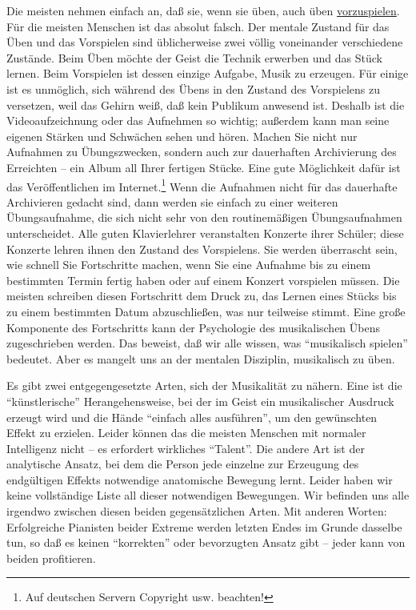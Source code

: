 Die meisten nehmen einfach an, daß sie, wenn sie üben, auch üben \hyperref[c1iii14]{vorzuspielen}.
Für die meisten Menschen ist das absolut falsch.
Der mentale Zustand für das Üben und das Vorspielen sind üblicherweise zwei völlig voneinander verschiedene Zustände.
Beim Üben möchte der Geist die Technik erwerben und das Stück lernen.
Beim Vorspielen ist dessen einzige Aufgabe, Musik zu erzeugen.
Für einige ist es unmöglich, sich während des Übens in den Zustand des Vorspielens zu versetzen, weil das Gehirn weiß, daß kein Publikum anwesend ist.
Deshalb ist die Videoaufzeichnung oder das Aufnehmen so wichtig; außerdem kann man seine eigenen Stärken und Schwächen sehen und hören.
Machen Sie nicht nur Aufnahmen zu Übungszwecken, sondern auch zur dauerhaften Archivierung des Erreichten -- ein Album all Ihrer fertigen Stücke.
Eine gute Möglichkeit dafür ist das Veröffentlichen im Internet.\footnote{Auf deutschen Servern Copyright usw. beachten!} 
Wenn die Aufnahmen nicht für das dauerhafte Archivieren gedacht sind, dann werden sie einfach zu einer weiteren Übungsaufnahme, die sich nicht sehr von den routinemäßigen Übungsaufnahmen unterscheidet.
Alle guten Klavierlehrer veranstalten Konzerte ihrer Schüler; diese Konzerte lehren ihnen den Zustand des Vorspielens.
Sie werden überrascht sein, wie schnell Sie Fortschritte machen, wenn Sie eine Aufnahme bis zu einem bestimmten Termin fertig haben oder auf einem Konzert vorspielen müssen.
Die meisten schreiben diesen Fortschritt dem Druck zu, das Lernen eines Stücks bis zu einem bestimmten Datum abzuschließen, was nur teilweise stimmt.
Eine große Komponente des Fortschritts kann der Psychologie des musikalischen Übens zugeschrieben werden.
Das beweist, daß wir alle wissen, was \enquote{musikalisch spielen} bedeutet.
Aber es mangelt uns an der mentalen Disziplin, musikalisch zu üben.

Es gibt zwei entgegengesetzte Arten, sich der Musikalität zu nähern.
Eine ist die \enquote{künstlerische} Herangehensweise, bei der im Geist ein musikalischer Ausdruck erzeugt wird und die Hände \enquote{einfach alles ausführen}, um den gewünschten Effekt zu erzielen.
Leider können das die meisten Menschen mit normaler Intelligenz nicht -- es erfordert wirkliches \enquote{Talent}.
Die andere Art ist der analytische Ansatz, bei dem die Person jede einzelne zur Erzeugung des endgültigen Effekts notwendige anatomische Bewegung lernt.
Leider haben wir keine vollständige Liste all dieser notwendigen Bewegungen.
Wir befinden uns alle irgendwo zwischen diesen beiden gegensätzlichen Arten.
Mit anderen Worten: Erfolgreiche Pianisten beider Extreme werden letzten Endes im Grunde dasselbe tun, so daß es keinen \enquote{korrekten} oder bevorzugten Ansatz gibt -- jeder kann von beiden profitieren.

